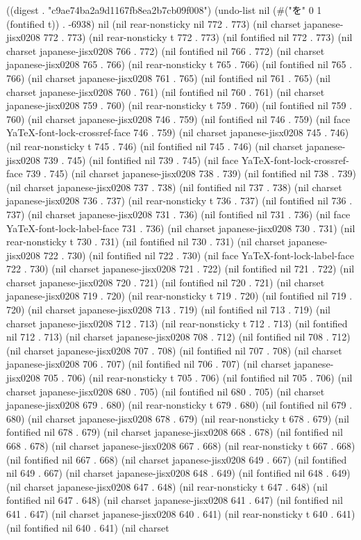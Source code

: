 
((digest . "c9ae74ba2a9d1167fb8ea2b7cb09f008") (undo-list nil (#("を" 0 1 (fontified t)) . -6938) nil (nil rear-nonsticky nil 772 . 773) (nil charset japanese-jisx0208 772 . 773) (nil rear-nonsticky t 772 . 773) (nil fontified nil 772 . 773) (nil charset japanese-jisx0208 766 . 772) (nil fontified nil 766 . 772) (nil charset japanese-jisx0208 765 . 766) (nil rear-nonsticky t 765 . 766) (nil fontified nil 765 . 766) (nil charset japanese-jisx0208 761 . 765) (nil fontified nil 761 . 765) (nil charset japanese-jisx0208 760 . 761) (nil fontified nil 760 . 761) (nil charset japanese-jisx0208 759 . 760) (nil rear-nonsticky t 759 . 760) (nil fontified nil 759 . 760) (nil charset japanese-jisx0208 746 . 759) (nil fontified nil 746 . 759) (nil face YaTeX-font-lock-crossref-face 746 . 759) (nil charset japanese-jisx0208 745 . 746) (nil rear-nonsticky t 745 . 746) (nil fontified nil 745 . 746) (nil charset japanese-jisx0208 739 . 745) (nil fontified nil 739 . 745) (nil face YaTeX-font-lock-crossref-face 739 . 745) (nil charset japanese-jisx0208 738 . 739) (nil fontified nil 738 . 739) (nil charset japanese-jisx0208 737 . 738) (nil fontified nil 737 . 738) (nil charset japanese-jisx0208 736 . 737) (nil rear-nonsticky t 736 . 737) (nil fontified nil 736 . 737) (nil charset japanese-jisx0208 731 . 736) (nil fontified nil 731 . 736) (nil face YaTeX-font-lock-label-face 731 . 736) (nil charset japanese-jisx0208 730 . 731) (nil rear-nonsticky t 730 . 731) (nil fontified nil 730 . 731) (nil charset japanese-jisx0208 722 . 730) (nil fontified nil 722 . 730) (nil face YaTeX-font-lock-label-face 722 . 730) (nil charset japanese-jisx0208 721 . 722) (nil fontified nil 721 . 722) (nil charset japanese-jisx0208 720 . 721) (nil fontified nil 720 . 721) (nil charset japanese-jisx0208 719 . 720) (nil rear-nonsticky t 719 . 720) (nil fontified nil 719 . 720) (nil charset japanese-jisx0208 713 . 719) (nil fontified nil 713 . 719) (nil charset japanese-jisx0208 712 . 713) (nil rear-nonsticky t 712 . 713) (nil fontified nil 712 . 713) (nil charset japanese-jisx0208 708 . 712) (nil fontified nil 708 . 712) (nil charset japanese-jisx0208 707 . 708) (nil fontified nil 707 . 708) (nil charset japanese-jisx0208 706 . 707) (nil fontified nil 706 . 707) (nil charset japanese-jisx0208 705 . 706) (nil rear-nonsticky t 705 . 706) (nil fontified nil 705 . 706) (nil charset japanese-jisx0208 680 . 705) (nil fontified nil 680 . 705) (nil charset japanese-jisx0208 679 . 680) (nil rear-nonsticky t 679 . 680) (nil fontified nil 679 . 680) (nil charset japanese-jisx0208 678 . 679) (nil rear-nonsticky t 678 . 679) (nil fontified nil 678 . 679) (nil charset japanese-jisx0208 668 . 678) (nil fontified nil 668 . 678) (nil charset japanese-jisx0208 667 . 668) (nil rear-nonsticky t 667 . 668) (nil fontified nil 667 . 668) (nil charset japanese-jisx0208 649 . 667) (nil fontified nil 649 . 667) (nil charset japanese-jisx0208 648 . 649) (nil fontified nil 648 . 649) (nil charset japanese-jisx0208 647 . 648) (nil rear-nonsticky t 647 . 648) (nil fontified nil 647 . 648) (nil charset japanese-jisx0208 641 . 647) (nil fontified nil 641 . 647) (nil charset japanese-jisx0208 640 . 641) (nil rear-nonsticky t 640 . 641) (nil fontified nil 640 . 641) (nil charset 